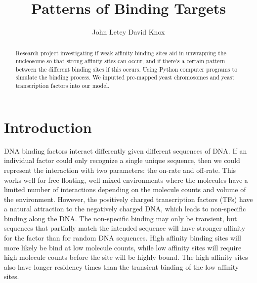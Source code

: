 \documentclass{article}
\title{Patterns of Binding Targets}
\author{
  John Letey \And David Knox
}
\newcommand{\tab}{\hspace{9mm}}
\begin{document}
\maketitle

\begin{abstract}
  Research project investigating if weak affinity binding sites aid in unwrapping the nucleosome so that strong affinity sites can occur, and if there's a certain pattern between the different binding sites if this occurs. Using Python computer programs to simulate the binding process. We inputted pre-mapped yeast chromosomes and yeast transcription factors into our model.%
\end{abstract}

\section{Introduction}
\tab DNA binding factors interact differently given different sequences of DNA. If an individual factor could only recognize a single unique sequence, then we could represent the interaction with two parameters: the on-rate and off-rate. This works well for free-floating, well-mixed environments where the molecules have a limited number of interactions depending on the molecule counts and volume of the environment. However, the positively charged transcription factors (TFs) have a natural attraction to the negatively charged DNA, which leads to non-specific binding along the DNA. The non-specific binding may only be transient, but sequences that partially match the intended sequence will have stronger affinity for the factor than for random DNA sequences. High affinity binding sites will more likely be bind at low molecule counts, while low affinity sites will require high molecule counts before the site will be highly bound. The high affinity sites also have longer residency times than the transient binding of the low affinity sites.
\end{document}

